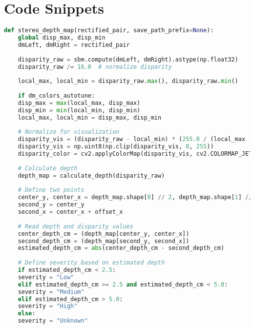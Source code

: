 %
%
%                 

\chapter{Code Snippets}
\label{sec:appendixa}

\begin{lstlisting}[language=Python, breaklines=true,caption={Function for generating stereo depth map and classifying pothole severity based on depth difference between two points}]
	def stereo_depth_map(rectified_pair, save_path_prefix=None):
	global disp_max, disp_min
	dmLeft, dmRight = rectified_pair
	
	disparity_raw = sbm.compute(dmLeft, dmRight).astype(np.float32)
	disparity_raw /= 16.0  # normalize disparity
	
	local_max, local_min = disparity_raw.max(), disparity_raw.min()
	
	if dm_colors_autotune:
	disp_max = max(local_max, disp_max)
	disp_min = min(local_min, disp_min)
	local_max, local_min = disp_max, disp_min
	
	# Normalize for visualization
	disparity_vis = (disparity_raw - local_min) * (255.0 / (local_max - local_min))
	disparity_vis = np.uint8(np.clip(disparity_vis, 0, 255))
	disparity_color = cv2.applyColorMap(disparity_vis, cv2.COLORMAP_JET)
	
	# Calculate depth
	depth_map = calculate_depth(disparity_raw)
	
	# Define two points
	center_y, center_x = depth_map.shape[0] // 2, depth_map.shape[1] // 2 - 20
	second_y = center_y
	second_x = center_x + offset_x
	
	# Read depth and disparity values
	center_depth_cm = (depth_map[center_y, center_x]) 
	second_depth_cm = (depth_map[second_y, second_x]) 
	estimated_depth_cm = abs(center_depth_cm - second_depth_cm)
	
	# Define severity based on estimated depth
	if estimated_depth_cm < 2.5:
	severity = "Low"
	elif estimated_depth_cm >= 2.5 and estimated_depth_cm < 5.0:
	severity = "Medium"
	elif estimated_depth_cm > 5.0:
	severity = "High"
	else:
	severity = "Unknown"
\end{lstlisting}

